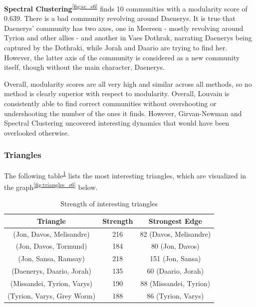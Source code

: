 \documentclass[10pt,twocolumn,letterpaper]{article}
\begin{document}
\textbf{Spectral Clustering}\textsuperscript{\ref{fig:sc_s6}} finds 10 communities with a modularity score of 0.639. There is a bad community revolving around Daenerys. It is true that Daenerys' community has two axes, one in Meereen - mostly revolving around Tyrion and other allies - and another in Vaes Dothrak, narrating Daenerys being captured by the Dothraki, while Jorah and Daario are trying to find her. However, the latter axis of the community is considered as a new community itself, though without the main character, Daenerys. 

Overall, modularity scores are all very high and similar across all methods, so no method is clearly superior with respect to modularity. Overall, Louvain is consistently able to find correct communities without overshooting or undershooting the number of the ones it finds. However, Girvan-Newman and Spectral Clustering uncovered interesting dynamics that would have been overlooked otherwise.


\subsubsection{Triangles}

The following table\textsuperscript{\ref{tab:triangles_s6}} lists the most interesting triangles, which are visualized in the graph\textsuperscript{\ref{fig:triangles_s6}} below.

\begin{table}[h!]
    \centering
    \small
    \begin{tabular}{c|c|c}
        Triangle & Strength & Strongest Edge  \\
        \hline
        (Jon, Davos, Melisandre) & 216 & 82 (Davos, Melisandre) \\
        (Jon, Davos, Tormund) & 184 & 80 (Jon, Davos) \\
        (Jon, Sansa, Ramsay) & 218 & 151 (Jon, Sansa) \\
        (Daenerys, Daario, Jorah) & 135 & 60 (Daario, Jorah) \\
        (Missandei, Tyrion, Varys) & 190 & 88 (Missandei, Tyrion) \\
        (Tyrion, Varys, Grey Worm) & 188 & 86 (Tyrion, Varys) \\
        \hline 
    \end{tabular} \\
    \vspace{0.2cm}
    \caption{Strength of interesting triangles}
    \label{tab:triangles_s6}
\end{table}
\end{document}
